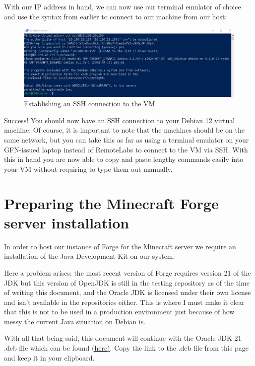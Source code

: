 \documentclass[]{article}
\begin{document}
With our IP address in hand, we can now use our terminal emulator of choice and use the syntax from earlier to connect to our machine from our host:

\begin{figure}[h!]
	\caption{Establishing an SSH connection to the VM}
	\centering
	\includegraphics[width=1\textwidth]{ssh}
\end{figure}
\FloatBarrier

Success! You should now have an SSH connection to your Debian 12 virtual machine. Of course, it is important to note that the machines should be on the same network, but you can take this as far as using a terminal emulator on your GFN-issued laptop instead of RemoteLabs to connect to the VM via SSH. With this in hand you are now able to copy and paste lengthy commands easily into your VM without requiring to type them out manually.

\section{Preparing the Minecraft Forge server installation}

In order to host our instance of Forge for the Minecraft server we require an installation of the Java Development Kit on our system.

Here a problem arises: the most recent version of Forge requires version 21 of the JDK but this version of OpenJDK is still in the testing repository as of the time of writing this document, and the Oracle JDK is licensed under their own license and isn't available in the repositories either. This is where I must make it clear that this is not to be used in a production environment just because of how messy the current Java situation on Debian is.

With all that being said, this document will continue with the Oracle JDK 21 .deb file which can be found \href{https://www.oracle.com/java/technologies/downloads/}{(here)}. Copy the link to the .deb file from this page and keep it in your clipboard.
\end{document}
